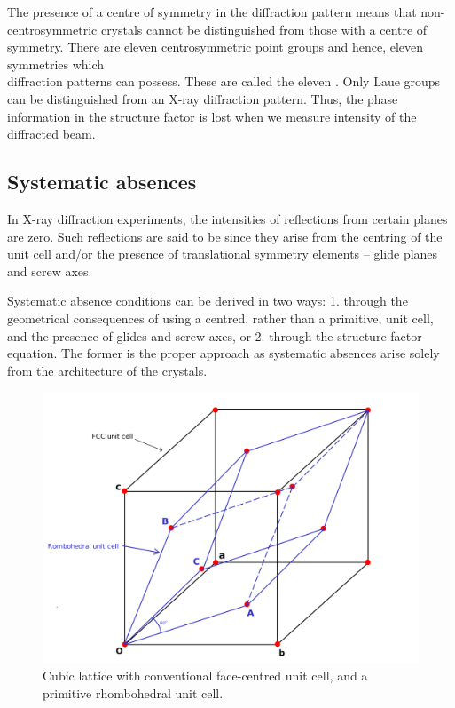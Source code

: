 	The presence of a centre of symmetry in the diffraction pattern means that non- centrosymmetric crystals cannot be distinguished from those with a centre of symmetry. There are eleven centrosymmetric point groups and hence, eleven symmetries which \\diffraction patterns can possess. These are called the eleven . Only Laue groups can be distinguished from an X-ray diffraction pattern. Thus, the phase information in the structure factor is lost when we measure intensity of the diffracted beam.


\subsection{Systematic absences}

	In X-ray diffraction experiments, the intensities of reflections from certain planes are zero. Such reflections are said to be  since they arise from the centring of the unit cell and/or the presence of translational symmetry elements -- glide planes and screw axes.
	
	Systematic absence conditions can be derived in two ways: 1. through the geometrical consequences of using a centred, rather than a primitive, unit cell, and the presence of glides and screw axes, or 2. through the structure factor equation. The former is the proper approach as systematic absences arise solely from the architecture of the crystals.
	
	\begin{figure}
	\centering
	\includegraphics[scale=0.12]{fcc_lattice.png}
	\caption{\label{fig:fcc_fr}Cubic lattice with conventional face-centred unit cell, and a primitive rhombohedral unit cell.}
	\end{figure}
	
